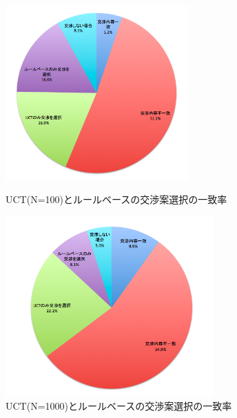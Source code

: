\documentclass[a4, 10pt,dvipdfmx]{jsarticle}
\begin{document}
\begin{figure}[htbp]
 \begin{minipage}{0.5\hsize}
    \begin{center}
      \includegraphics[width=70mm]{img/match_100.png}
    \end{center}
    \caption{UCT(N=100)とルールベースの交渉案選択の一致率}
    \label{match_100}
 \end{minipage}
 \begin{minipage}{0.5\hsize}
    \begin{center}
      \includegraphics[width=80mm]{img/match_1000.png}
    \end{center}
    \caption{UCT(N=1000)とルールベースの交渉案選択の一致率}
    \label{match_1000}
 \end{minipage}
\end{figure}
\end{document}
